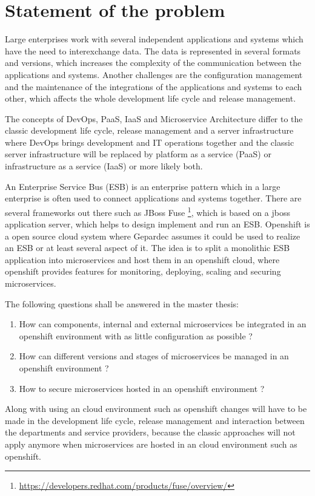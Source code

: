 \section{Statement of the problem}
\label{sec:statement-of-the-problem}
Large enterprises work with several independent applications and systems which have the need to interexchange data. The data is represented in several formats and versions, which increases the complexity of the communication between the applications and systems. Another challenges are the configuration management and the maintenance of the integrations of the applications and systems to each other, which affects the whole development life cycle and release management.

The concepts of DevOps, PaaS, IaaS and Microservice Architecture differ to the classic development life cycle, release management and a server infrastructure where DevOps brings development and IT operations together and the classic server infrastructure will be replaced by platform as a service (PaaS) or infrastructure as a service (IaaS) or more likely both. 

An Enterprise Service Bus (ESB) is an enterprise pattern which in a large enterprise is often used to connect applications and systems together. There are several frameworks out there such as JBoss Fuse \footnote{\url{https://developers.redhat.com/products/fuse/overview/}}, which is based on a jboss application server, which helps to design implement and run an ESB. Openshift is a open source cloud system where Gepardec assumes it could be used to realize an ESB or at least several aspect of it. The idea is to split a monolithic ESB application into microservices and host them in an openshift cloud, where openshift provides features for monitoring, deploying, scaling and securing microservices.

The following questions shall be answered in the master thesis:
\begin{enumerate}
	\item How can components, internal and external microservices be integrated in an openshift environment with as little configuration as possible ?
	\item How can different versions and stages of microservices be managed in an openshift environment ?
	\item How to secure microservices hosted in an openshift environment ?
\end{enumerate}
Along with using an cloud environment such as openshift changes will have to be made in the development life cycle, release management and interaction between the departments and service providers, because the classic approaches will not apply anymore when microservices are hosted in an cloud environment such as openshift.

